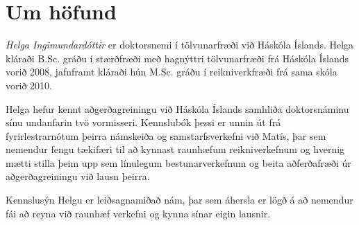 \chapter*{Um höfund}
\emph{Helga Ingimundardóttir} er doktorsnemi í tölvunarfræði við Háskóla Íslands. Helga kláraði B.Sc. gráðu í stærðfræði með hagnýttri tölvunarfræði frá Háskóla Íslands vorið 2008, jafnframt kláraði hún M.Sc. gráðu í reikniverkfræði frá sama skóla vorið 2010. 

Helga hefur kennt aðgerðagreiningu við Háskóla Íslands samhliða doktorsnáminu sínu undanfarin tvö vormisseri. Kennslubók þessi er unnin út frá fyrirlestrarnótum þeirra námskeiða og samstarfsverkefni við Matís, þar sem nemendur fengu tækifæri til að kynnast raunhæfum reikniverkefnum og hvernig mætti stilla þeim upp sem línulegum bestunarverkefnum og beita aðferðafræði úr aðgerðagreiningu við lausn þeirra. 

Kennslusýn Helgu er leiðsagnamiðað nám, þar sem áhersla er lögð á að nemendur 
fái að reyna við raunhæf verkefni og kynna sínar eigin lausnir. 

